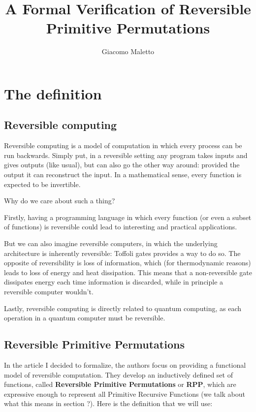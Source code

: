 \documentclass{book}
\title{A Formal Verification of Reversible Primitive Permutations}
\author{Giacomo Maletto}
\date{}
\theoremstyle{definition}
\theoremstyle{remark}
\begin{document}
\maketitle

\chapter{The definition}

\section{Reversible computing}

Reversible computing is a model of computation in which every process can be run backwards.
Simply put, in a reversible setting any program takes inputs and gives outputs (like usual), but can also go the other way around:
provided the output it can reconstruct the input.
In a mathematical sense, every function is expected to be invertible.

Why do we care about such a thing?

Firstly, having a programming language in which every function (or even a subset of functions) is reversible could lead to interesting and practical applications.

But we can also imagine reversible computers, in which the underlying architecture is inherently reversible:
Toffoli gates provides a way to do so.
The opposite of reversibility is loss of information, which (for thermodynamic reasons) leads to loss of energy and heat dissipation.
This means that a non-reversible gate dissipates energy each time information is discarded, while in principle a reversible computer wouldn't.

Lastly, reversible computing is directly related to quantum computing, as each operation in a quantum computer must be reversible.


\section{Reversible Primitive Permutations}

In the article I decided to formalize, the authors focus on providing a functional model of reversible computation.
They develop an inductively defined set of functions, called \textbf{Reversible Primitive Permutations} or \textbf{RPP},
which are expressive enough to represent all Primitive Recursive Functions (we talk about what this means in section ?).
Here is the definition that we will use:
\end{document}
